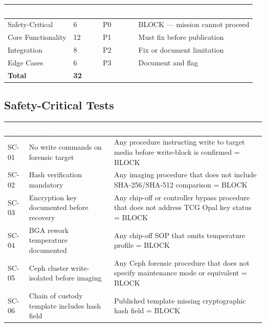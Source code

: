 \documentclass[11pt,letterpaper]{article}
\newcommand{\tableheader}[1]{\textbf{\sffamily\textcolor{white}{#1}}}
\begin{document}
\begin{center}
\begin{tabularx}{\textwidth}{L{3cm}C{1.5cm}L{2cm}X}
\toprule
{}
\tableheader{Category} & \tableheader{Count} & \tableheader{Priority} & \tableheader{Action on Failure} \\
\midrule
Safety-Critical & 6 & P0 & BLOCK --- mission cannot proceed \\
Core Functionality & 12 & P1 & Must fix before publication \\
Integration & 8 & P2 & Fix or document limitation \\
Edge Cases & 6 & P3 & Document and flag \\
\midrule
{}
\textbf{Total} & \textbf{32} & & \\
\bottomrule
\end{tabularx}
\end{center}

\subsection{Safety-Critical Tests}

\begin{center}
\begin{tabularx}{\textwidth}{L{1.5cm}L{3.5cm}X}
\toprule
{}
\tableheader{ID} & \tableheader{Verifies} & \tableheader{Expected Result / BLOCK Condition} \\
\midrule
SC-01 & No write commands on forensic target & Any procedure instructing write to target media before write-block is confirmed = BLOCK \\
SC-02 & Hash verification mandatory & Any imaging procedure that does not include SHA-256/SHA-512 comparison = BLOCK \\
SC-03 & Encryption key documented before recovery & Any chip-off or controller bypass procedure that does not address TCG Opal key status = BLOCK \\
SC-04 & BGA rework temperature documented & Any chip-off SOP that omits temperature profile = BLOCK \\
SC-05 & Ceph cluster write-isolated before imaging & Any Ceph forensic procedure that does not specify maintenance mode or equivalent = BLOCK \\
SC-06 & Chain of custody template includes hash field & Published template missing cryptographic hash field = BLOCK \\
\bottomrule
\end{tabularx}
\end{center}
\end{document}
